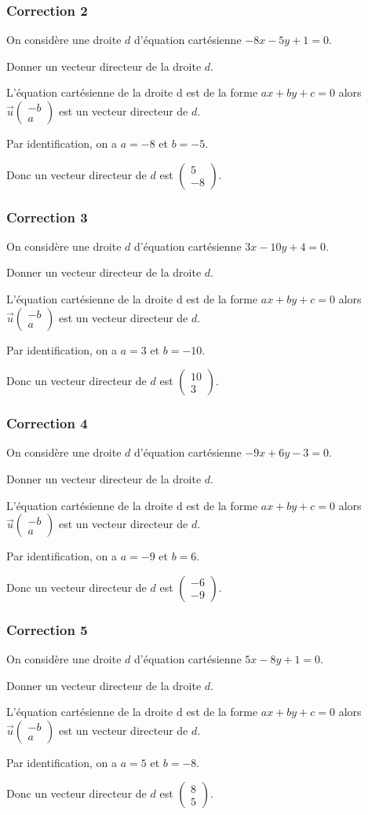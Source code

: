 \documentclass[15pt, mathserif]{beamer}
\newcommand{\vco}[2]{\begin{pmatrix} #1 \\ #2 \end{pmatrix}} %
\begin{document}
\begin{frame}
\vspace{-10mm}
	\frametitle{Correction 2}
 On considère une droite $d$ d'équation cartésienne $-8x-5y+1=0$. 
 
 Donner un vecteur directeur de la droite $d$. 
 
 \bigskip 
 
 L'équation cartésienne de la droite d est de la forme $ax + by + c = 0$ alors $\overrightarrow{u}\vco{-b}{a}$ est un vecteur directeur de $d$. 
 
 Par identification, on a $a=-8$ et $b=-5$. 
 
 Donc un vecteur directeur de $d$ est $\vco{5}{-8}$.\end{frame}


\begin{frame}
\vspace{-10mm}
	\frametitle{Correction 3}
 On considère une droite $d$ d'équation cartésienne $3x-10y+4=0$. 
 
 Donner un vecteur directeur de la droite $d$. 
 
 \bigskip 
 
 L'équation cartésienne de la droite d est de la forme $ax + by + c = 0$ alors $\overrightarrow{u}\vco{-b}{a}$ est un vecteur directeur de $d$. 
 
 Par identification, on a $a=3$ et $b=-10$. 
 
 Donc un vecteur directeur de $d$ est $\vco{10}{3}$.\end{frame}


\begin{frame}
\vspace{-10mm}
	\frametitle{Correction 4}
 On considère une droite $d$ d'équation cartésienne $-9x+6y-3=0$. 
 
 Donner un vecteur directeur de la droite $d$. 
 
 \bigskip 
 
 L'équation cartésienne de la droite d est de la forme $ax + by + c = 0$ alors $\overrightarrow{u}\vco{-b}{a}$ est un vecteur directeur de $d$. 
 
 Par identification, on a $a=-9$ et $b=6$. 
 
 Donc un vecteur directeur de $d$ est $\vco{-6}{-9}$.\end{frame}


\begin{frame}
\vspace{-10mm}
	\frametitle{Correction 5}
 On considère une droite $d$ d'équation cartésienne $5x-8y+1=0$. 
 
 Donner un vecteur directeur de la droite $d$. 
 
 \bigskip 
 
 L'équation cartésienne de la droite d est de la forme $ax + by + c = 0$ alors $\overrightarrow{u}\vco{-b}{a}$ est un vecteur directeur de $d$. 
 
 Par identification, on a $a=5$ et $b=-8$. 
 
 Donc un vecteur directeur de $d$ est $\vco{8}{5}$.\end{frame}
\end{document}
